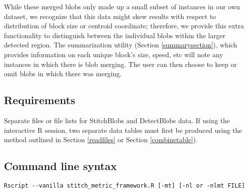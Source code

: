\documentclass{article}
\begin{document}

While these merged blobs only made up a small subset of instances in our own dataset, we recognize that this data might skew results with respect to distribution of block size or centroid coordinate; therefore, we provide this extra functionality to distinguish between the individual blobs within the larger detected region. The summarization utility (Section \ref{summarysection}), which provides information on each unique block's size, speed, etc will note any instances in which there is blob merging. The user can then choose to keep or omit blobs in which there was merging.

\subsection{Requirements}
Separate files or file lists for StitchBlobs and DetectBlobs data. If using the interactive R session, two separate data tables must first be produced using the method outlined in Section \ref{readfiles} or Section \ref{combinetable}). 

\subsection{Command line syntax}
\begin{verbatim}
Rscript --vanilla stitch_metric_framework.R [-mt] [-nl or -nlmt FILE]
\end{verbatim}
\end{document}
